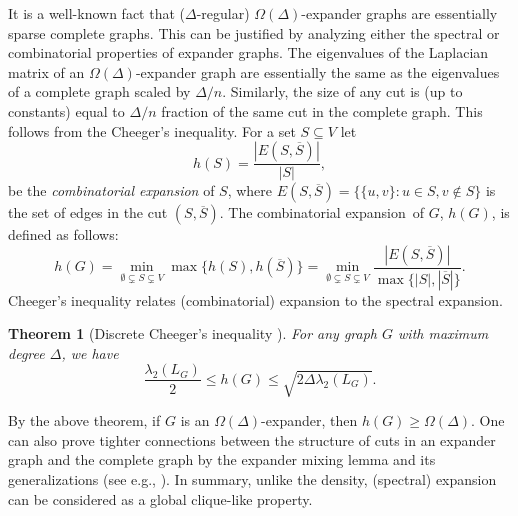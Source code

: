 \documentclass[11pt]{article}
\def\h{h}
\def\expansion{expansion}
\newtheorem{theorem}{Theorem}[section]
\begin{document}
It is a well-known fact that ($\Delta$-regular)  $\Omega(\Delta)$-expander graphs are essentially sparse complete graphs.
This can be justified    by analyzing either the spectral or combinatorial properties of expander graphs. The eigenvalues of the Laplacian matrix of an $\Omega(\Delta)$-expander graph are essentially the same as the eigenvalues of a complete graph scaled by $\Delta/n$. 
Similarly, the size of any cut is (up to constants) equal to $\Delta/n$ fraction of the same cut in the complete graph. This  follows from the Cheeger's inequality.
For a set $S\subseteq V$ let
$$ h(S)=\frac{|E(S,\overline{S})|}{ |S|},$$
be the \emph{combinatorial expansion} of $S$, where $E(S,\overline{S})=\{\{u,v\}: u\in S, v\notin S\}$ is the set of edges in the cut $(S,\overline{S})$. The combinatorial \expansion~of $G$, $\h(G)$, is defined as follows:
$$ \h(G) = \min_{\emptyset \subsetneq S\subsetneq V} \max\{\h(S),\h(\overline{S})\}=\min_{\emptyset \subsetneq S\subsetneq V} \frac{|E(S,\overline{S})|}{\max\{|S|,|\overline{S}|\}}.$$
 Cheeger's inequality relates (combinatorial) expansion to the spectral expansion.
\begin{theorem}[Discrete Cheeger's inequality \cite{AM85,Alon86}]
\label{thm:cheeger}
For any graph $G$ with maximum degree $\Delta$, we have
	\begin{equation}\label{eq:cheeger} \frac{\lambda_2(L_G)}{2} \leq h(G) \leq \sqrt{2\Delta \lambda_2(L_G)}.	
	\end{equation}
\end{theorem}
By the above theorem, if $G$ is an $\Omega(\Delta)$-expander, then $\h(G)\geq \Omega(\Delta)$. 
One can also prove tighter connections between the structure of cuts in an expander graph and the complete graph by  the expander mixing lemma and its generalizations (see e.g., \cite{BL04}).
In summary, unlike the density, (spectral) expansion can be considered as a global clique-like property.
\end{document}
